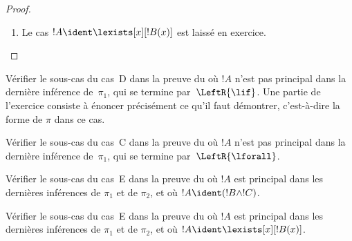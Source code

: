 \documentclass[../../../include/open-logic-section]{subfiles}
\begin{document}
\begin{proof}
\begin{enumerate}
La !!{proof}~$\pi_1'$ a pour séquent final
$\Gamma\Sequent\Delta,!B(c)$, où $c$ est la variable
propre d'une inférence~$\RightR{\lforall}$.
Ainsi, $c$ n'apparaît ni dans~$!B(x)$, ni dans
$\Gamma$, ni dans~$\Delta$.
Nous supposons la preuve~$\pi$ régulière :
la constante $c$ n'est la variable propre que de cette
inférence universelle, et elle apparaît seulement
au-dessus d'elle, donc dans~$\pi_1'$.
Elle n'est la variable propre d'aucune inférence
interne à cette sous-preuve.
Puisque $c$ n'apparaît pas dans~$\pi_2$, elle ne figure
pas dans~$t$. La régularité de toute la preuve garantit
aussi que ce terme de la seconde branche ne contient
aucune variable propre de la première.
Par le ,
$\Subst{\pi_1'}{t}{c}$ est une !!{proof} de
$\Gamma\Sequent\Delta,!B(t)$.
L'hypothèse de récurrence s'applique maintenant à
\[
\AxiomC{}
\RightLabel{$\Subst{\pi_1'}{t}{c}$}
\Deduce$\Gamma \fCenter \Delta, !B(t)$
\AxiomC{}
\RightLabel{$\pi_2''$}
\Deduce$!B(t), \Gamma \fCenter \Delta$
\RightLabel{\CutCS}
\BinaryInf$\Gamma \fCenter \Delta$
\DisplayProof
\]
Sa !!{formula} de coupure est~$!B(t)$ :
son rang est strictement inférieur à celui de~$\pi$.

\item Le cas $!A\ident\lexists[x][!B(x)]$ est laissé en exercice.
\end{enumerate}
\end{proof}

\begin{prob}
Vérifier le sous-cas du cas~D dans la preuve du
 où $!A$ n'est pas principal
dans la dernière inférence de~$\pi_1$, qui se termine
par~$\LeftR{\lif}$.
Une partie de l'exercice consiste à énoncer précisément
ce qu'il faut démontrer, c'est-à-dire la forme de $\pi$
dans ce cas.
\end{prob}

\begin{prob}
Vérifier le sous-cas du cas~C dans la preuve du
 où $!A$ n'est pas principal
dans la dernière inférence de~$\pi_1$, qui se termine
par~$\LeftR{\lforall}$.
\end{prob}

\begin{prob}
Vérifier le sous-cas du cas~E dans la preuve du
 où $!A$ est principal
dans les dernières inférences de $\pi_1$ et de $\pi_2$,
et où $!A\ident(!B\land!C)$.
\end{prob}

\begin{prob}
Vérifier le sous-cas du cas~E dans la preuve du
 où $!A$ est principal
dans les dernières inférences de $\pi_1$ et de $\pi_2$,
et où $!A\ident\lexists[x][!B(x)]$.
\end{prob}
\end{document}
